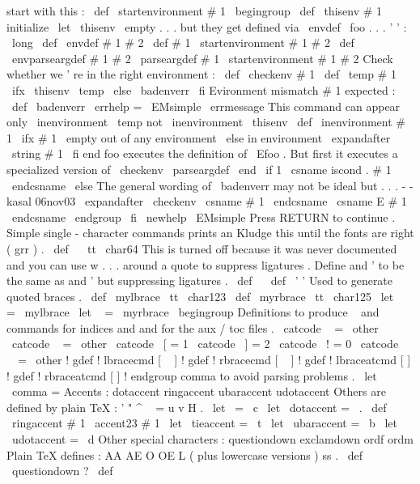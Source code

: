 {start
with
this
:
\
def
\
startenvironment
#
1
{
\
begingroup
\
def
\
thisenv
{
#
1
}
}
%
initialize
\
let
\
thisenv
\
empty
%
.
.
.
but
they
get
defined
via
\
envdef
\
foo
{
.
.
.
}
'
'
:
\
long
\
def
\
envdef
#
1
#
2
{
\
def
#
1
{
\
startenvironment
#
1
#
2
}
}
\
def
\
envparseargdef
#
1
#
2
{
\
parseargdef
#
1
{
\
startenvironment
#
1
#
2
}
}
%
Check
whether
we
'
re
in
the
right
environment
:
\
def
\
checkenv
#
1
{
%
\
def
\
temp
{
#
1
}
%
\
ifx
\
thisenv
\
temp
\
else
\
badenverr
\
fi
}
%
Evironment
mismatch
#
1
expected
:
\
def
\
badenverr
{
%
\
errhelp
=
\
EMsimple
\
errmessage
{
This
command
can
appear
only
\
inenvironment
\
temp
not
\
inenvironment
\
thisenv
}
%
}
\
def
\
inenvironment
#
1
{
%
\
ifx
#
1
\
empty
out
of
any
environment
%
\
else
in
environment
\
expandafter
\
string
#
1
%
\
fi
}
%
end
foo
executes
the
definition
of
\
Efoo
.
%
But
first
it
executes
a
specialized
version
of
\
checkenv
%
\
parseargdef
\
end
{
%
\
if
1
\
csname
iscond
.
#
1
\
endcsname
\
else
%
The
general
wording
of
\
badenverr
may
not
be
ideal
but
.
.
.
-
-
kasal
06nov03
\
expandafter
\
checkenv
\
csname
#
1
\
endcsname
\
csname
E
#
1
\
endcsname
\
endgroup
\
fi
}
\
newhelp
\
EMsimple
{
Press
RETURN
to
continue
.
}
%
%
Simple
single
-
character
commands
%
prints
an
%
Kludge
this
until
the
fonts
are
right
(
grr
)
.
\
def
\
{
{
\
tt
\
char64
}
}
%
This
is
turned
off
because
it
was
never
documented
%
and
you
can
use
w
{
.
.
.
}
around
a
quote
to
suppress
ligatures
.
%
%
Define
and
'
to
be
the
same
as
and
'
%
%
but
suppressing
ligatures
.
%
\
def
\
{
{
}
}
%
\
def
\
'
{
{
'
}
}
%
Used
to
generate
quoted
braces
.
\
def
\
mylbrace
{
{
\
tt
\
char123
}
}
\
def
\
myrbrace
{
{
\
tt
\
char125
}
}
\
let
\
{
=
\
mylbrace
\
let
\
}
=
\
myrbrace
\
begingroup
%
Definitions
to
produce
\
{
and
\
}
commands
for
indices
%
and
{
and
}
for
the
aux
/
toc
files
.
\
catcode
\
{
=
\
other
\
catcode
\
}
=
\
other
\
catcode
\
[
=
1
\
catcode
\
]
=
2
\
catcode
\
!
=
0
\
catcode
\
\
=
\
other
!
gdef
!
lbracecmd
[
\
{
]
%
!
gdef
!
rbracecmd
[
\
}
]
%
!
gdef
!
lbraceatcmd
[
{
]
%
!
gdef
!
rbraceatcmd
[
}
]
%
!
endgroup
%
comma
{
}
to
avoid
parsing
problems
.
\
let
\
comma
=
%
Accents
:
dotaccent
ringaccent
ubaraccent
udotaccent
%
Others
are
defined
by
plain
TeX
:
'
"
^
~
=
u
v
H
.
\
let
\
=
\
c
\
let
\
dotaccent
=
\
.
\
def
\
ringaccent
#
1
{
{
\
accent23
#
1
}
}
\
let
\
tieaccent
=
\
t
\
let
\
ubaraccent
=
\
b
\
let
\
udotaccent
=
\
d
%
Other
special
characters
:
questiondown
exclamdown
ordf
ordm
%
Plain
TeX
defines
:
AA
AE
O
OE
L
(
plus
lowercase
versions
)
ss
.
\
def
\
questiondown
{
?
}
\
def
\
}
